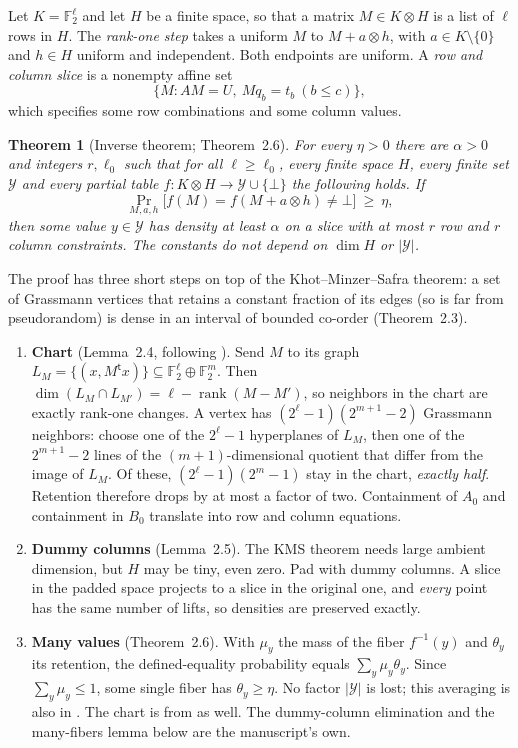 \documentclass[11pt]{article}
\newtheorem{theorem}{Theorem}[section]
\theoremstyle{definition}
\theoremstyle{remark}
\DeclareMathOperator{\rank}{rank}
\newcommand{\Fb}{\mathbb F_2}
\begin{document}
Let $K=\Fb^\ell$ and let $H$ be a finite space, so that a matrix
$M\in K\otimes H$ is a list of $\ell$ rows in $H$. The \emph{rank-one step}
takes a uniform $M$ to $M+a\otimes h$, with $a\in K\setminus\{0\}$ and
$h\in H$ uniform and independent. Both endpoints are uniform. A \emph{row and
column slice} is a nonempty affine set
\[
 \{M: AM=U,\ Mq_b=t_b\ (b\le c)\},
\]
which specifies some row combinations and some column values.

\begin{theorem}[Inverse theorem; Theorem~2.6]\label{thm:inverse}
For every $\eta>0$ there are $\alpha>0$ and integers $r,\ell_0$ such that for
all $\ell\ge\ell_0$, every finite space $H$, every finite set $\mathcal Y$
and every partial table $f:K\otimes H\to\mathcal Y\cup\{\bot\}$ the following
holds. If
\[
 \Pr_{M,a,h}\bigl[f(M)=f(M+a\otimes h)\neq\bot\bigr]\ \ge\ \eta,
\]
then some value $y\in\mathcal Y$ has density at least $\alpha$ on a slice
with at most $r$ row and $r$ column constraints. The constants do not depend
on $\dim H$ or $|\mathcal Y|$.
\end{theorem}

The proof has three short steps on top of the Khot--Minzer--Safra theorem: a
set of Grassmann vertices that retains a constant fraction of its edges (so
is far from pseudorandom) is dense in an interval of bounded co-order
\cite{KMS18} (Theorem~2.3).
\begin{enumerate}
\item \textbf{Chart} (Lemma~2.4, following \cite{BKS}). Send $M$ to its
graph $L_M=\{(x,M^{\mathsf t}x)\}\subseteq\Fb^\ell\oplus\Fb^m$. Then
$\dim(L_M\cap L_{M'})=\ell-\rank(M-M')$, so neighbors in the chart are
exactly rank-one changes. A vertex has $(2^\ell-1)(2^{m+1}-2)$ Grassmann
neighbors: choose one of the $2^\ell-1$ hyperplanes of $L_M$, then one of
the $2^{m+1}-2$ lines of the $(m+1)$-dimensional quotient that differ from the
image of $L_M$. Of these,
$(2^\ell-1)(2^m-1)$ stay in the chart, \emph{exactly half}. Retention
therefore drops by at most a factor of two. Containment of $A_0$ and
containment in $B_0$ translate into row and column equations.
\item \textbf{Dummy columns} (Lemma~2.5). The KMS theorem needs large ambient
dimension, but $H$ may be tiny, even zero. Pad with dummy columns. A slice in
the padded space projects to a slice in the original one, and \emph{every}
point has the same number of lifts, so densities are preserved exactly.
\item \textbf{Many values} (Theorem~2.6). With $\mu_y$ the mass of the
fiber $f^{-1}(y)$ and $\theta_y$ its retention, the defined-equality
probability equals $\sum_y\mu_y\theta_y$. Since $\sum_y\mu_y\le1$, some single
fiber has $\theta_y\ge\eta$. No factor $|\mathcal Y|$ is lost; this averaging
is also in \cite{BKS}. The chart is from \cite{BKS} as well. The
dummy-column elimination and the many-fibers lemma below are the
manuscript's own.
\end{enumerate}
\end{document}
